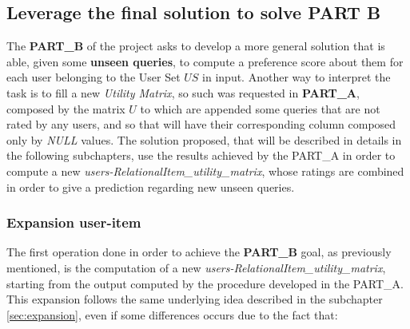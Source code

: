 \subsection{Leverage the final solution to solve PART B}
The \textbf{PART\_B} of the project asks to develop a more general solution that is able, given some \textbf{unseen queries}, to compute a preference score about them for each user belonging to the User Set $US$ in input. Another way to interpret the task is to fill a new \textit{Utility Matrix}, so such was requested in \textbf{PART\_A}, composed by the matrix $U$ to which are appended some queries that are not rated by any users, and so that will have their corresponding column composed only by \textit{NULL} values. The solution proposed, that will be described in details in the following subchapters, use the results achieved by the PART\_A in order to compute a new \textit{users-RelationalItem\_utility\_matrix}, whose ratings are combined in order to give a prediction regarding new unseen queries.

\subsubsection{Expansion user-item}
The first operation done in order to achieve the \textbf{PART\_B} goal, as previously mentioned, is the computation of a new \textit{users-RelationalItem\_utility\_matrix}, starting from the output computed by the procedure developed in the PART\_A. This expansion follows the same underlying idea described in the subchapter \ref{sec:expansion}, even if some differences occurs due to the fact that:


